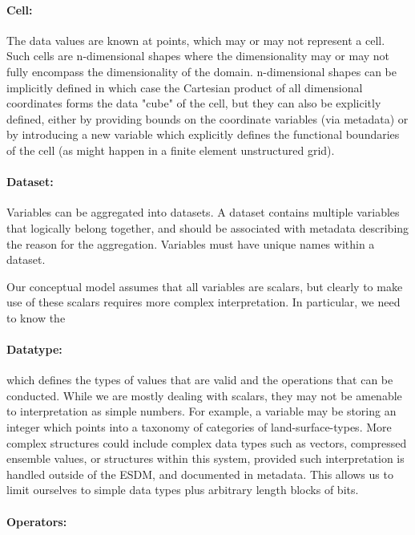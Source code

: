 \paragraph{Cell:}%
\label{cell}

The data values are known at points, which may or may not represent a cell. 
Such cells are n-dimensional shapes where the dimensionality may or may not fully encompass the dimensionality of the domain.
n-dimensional shapes can be implicitly defined in which case the Cartesian product of all dimensional coordinates forms the data "cube" of the cell, but they can also be explicitly defined, either by providing bounds on the coordinate variables (via metadata) or by introducing a new variable which explicitly defines the functional boundaries of the cell (as might happen in a finite element unstructured
grid).

\paragraph{Dataset:}%
\label{dataset}

Variables can be aggregated into datasets. A dataset contains multiple variables that logically belong together, and should be associated with metadata describing the reason for the aggregation. 
Variables must have unique names within a dataset.

Our conceptual model assumes that all variables are scalars, but clearly to make use of these scalars requires more complex interpretation. 
In particular, we need to know the

\paragraph{Datatype:}%
\label{datatype}

which defines the types of values that are valid and the operations that can be conducted. 
While we are mostly dealing with scalars, they may not be amenable to interpretation as simple numbers. 
For example, a variable may be storing an integer which points into a taxonomy of categories of land-surface-types. 
More complex structures could include complex data types such as vectors, compressed ensemble values, or structures within this system, provided such interpretation is handled outside of the ESDM, and documented in metadata. 
This allows us to limit ourselves to simple data types plus arbitrary length blocks of bits.

\paragraph{Operators:}%
\label{operators}

